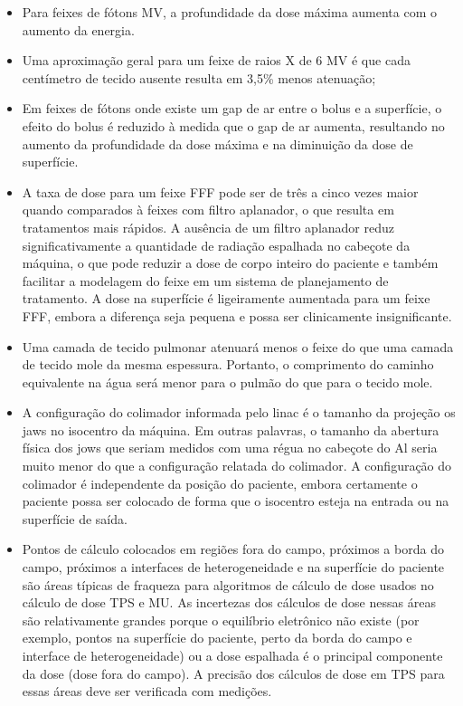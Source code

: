 \documentclass[11pt,a4paper]{article}
\newcounter{exemplo}
\begin{document}
\begin{exemplo}[Radioterapia]
    \begin{itemize}
        \item Para feixes de fótons MV, a profundidade da dose máxima aumenta com o aumento da energia.
        
        \item Uma aproximação geral para um feixe de raios X de 6 MV é que cada centímetro de tecido ausente resulta em 3,5\% menos atenuação;
        
        \item Em feixes de fótons onde existe um gap de ar entre o bolus e a superfície, o efeito do bolus é reduzido à medida que o gap de ar aumenta, resultando no aumento da profundidade da dose máxima e na diminuição da dose de superfície.
        
        \item A taxa de dose para um feixe FFF pode ser de três a cinco vezes maior quando comparados à feixes com filtro aplanador, o que resulta em tratamentos mais rápidos. A ausência de um filtro aplanador reduz significativamente a quantidade de radiação espalhada no cabeçote da máquina, o que pode reduzir a dose de corpo inteiro do paciente e também facilitar a modelagem do feixe em um sistema de planejamento de tratamento. A dose na superfície é ligeiramente aumentada para um feixe FFF, embora a diferença seja pequena e possa ser clinicamente insignificante.
        
        \item Uma camada de tecido pulmonar atenuará menos o feixe do que uma camada de tecido mole da mesma espessura. Portanto, o comprimento do caminho equivalente na água será menor para o pulmão do que para o tecido mole.
        
        \item A configuração do colimador informada pelo linac é o tamanho da projeção os jaws no isocentro da máquina. Em outras palavras, o tamanho da abertura física dos jows que seriam medidos com uma régua no cabeçote do Al seria muito menor do que a configuração relatada do colimador. A configuração do colimador é independente da posição do paciente, embora certamente o paciente possa ser colocado de forma que o isocentro esteja na entrada ou na superfície de saída.
        
        \item Pontos de cálculo colocados em regiões fora do campo, próximos a borda do campo, próximos a interfaces de heterogeneidade e na superfície do paciente são áreas típicas de fraqueza para algoritmos de cálculo de dose usados no cálculo de dose TPS e MU. As incertezas dos cálculos de dose nessas áreas são relativamente grandes porque o equilíbrio eletrônico não existe (por exemplo, pontos na superfície do paciente, perto da borda do campo e interface de heterogeneidade) ou a dose espalhada é o principal componente da dose (dose fora do campo). A precisão dos cálculos de dose em TPS para essas áreas deve ser verificada com medições.
        

\end{itemize}
\end{exemplo}
\end{document}
